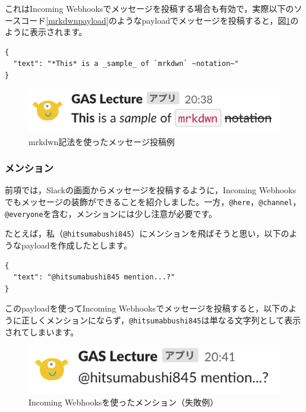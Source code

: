 \documentclass[uplatex,a4j]{jsarticle}
\begin{document}
これはIncoming Webhooksでメッセージを投稿する場合も有効で，実際以下のソースコード\ref{mrkdwnpayload}のようなpayloadでメッセージを投稿すると，図\ref{fig:mrkdwn_payload1}のように表示されます。

\begin{lstlisting}[basicstyle=\ttfamily\footnotesize,frame=single,caption=mrkdwn payload sample,label=mrkdwnpayload]
{
  "text": "*This* is a _sample_ of `mrkdwn` ~notation~"
}
\end{lstlisting}

\begin{figure}[H]
 \centering
 \includegraphics[keepaspectratio, scale=0.8]{images/mrkdwn_payload1.png}
 \caption{mrkdwn記法を使ったメッセージ投稿例}
 \label{fig:mrkdwn_payload1}
\end{figure}


\subsubsection{メンション}

前項では，Slackの画面からメッセージを投稿するように，Incoming Webhooksでもメッセージの装飾ができることを紹介しました。一方，\verb|@here|，\verb|@channel|，\verb|@everyone|を含む，メンションには少し注意が必要です。


たとえば，私（\verb|@hitsumabushi845|）にメンションを飛ばそうと思い，以下のようなpayloadを作成したとします。

\begin{lstlisting}[basicstyle=\ttfamily\footnotesize,frame=single,caption=mention payload sample1,label=mrkdwnpayload]
{
  "text": "@hitsumabushi845 mention...?"
}
\end{lstlisting}

このpayloadを使ってIncoming Webhooksでメッセージを投稿すると，以下のように正しくメンションにならず，\verb|@hitsumabbushi845|は単なる文字列として表示されてしまいます。

\begin{figure}[H]
 \centering
 \includegraphics[keepaspectratio, scale=0.8]{images/mention1.png}
 \caption{Incoming Webhooksを使ったメンション（失敗例）}
 \label{fig:mention1}
\end{figure}
\end{document}
